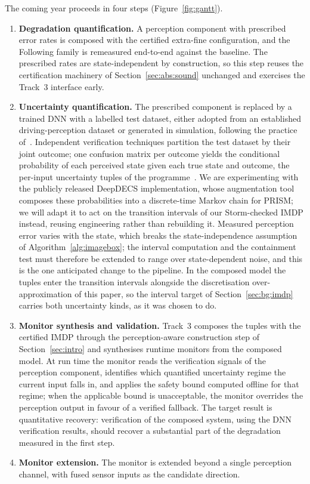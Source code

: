 \documentclass[11pt,a4paper]{article}
\theoremstyle{plain}
\theoremstyle{remark}
\begin{document}
	The coming year proceeds in four steps (Figure~\ref{fig:gantt}).
	\begin{enumerate}
		\item \textbf{Degradation quantification.} A perception component with prescribed error rates is composed with the certified extra-fine configuration, and the Following family is remeasured end-to-end against the baseline. The prescribed rates are state-independent by construction, so this step reuses the certification machinery of Section~\ref{sec:abs:sound} unchanged and exercises the Track~3 interface early.
		\item \textbf{Uncertainty quantification.} The prescribed component is replaced by a trained DNN with a labelled test dataset, either adopted from an established driving-perception dataset or generated in simulation, following the practice of~\cite{DeepDECS24}. Independent verification techniques partition the test dataset by their joint outcome; one confusion matrix per outcome yields the conditional probability of each perceived state given each true state and outcome, the per-input uncertainty tuples of the programme~\cite{DeepDECS24}. We are experimenting with the publicly released DeepDECS implementation, whose augmentation tool composes these probabilities into a discrete-time Markov chain for PRISM; we will adapt it to act on the transition intervals of our Storm-checked IMDP instead, reusing engineering rather than rebuilding it. Measured perception error varies with the state, which breaks the state-independence assumption of Algorithm~\ref{alg:imagebox}; the interval computation and the containment test must therefore be extended to range over state-dependent noise, and this is the one anticipated change to the pipeline. In the composed model the tuples enter the transition intervals alongside the discretisation over-approximation of this paper, so the interval target of Section~\ref{sec:bg:imdp} carries both uncertainty kinds, as it was chosen to do.
		\item \textbf{Monitor synthesis and validation.} Track~3 composes the tuples with the certified IMDP through the perception-aware construction step of Section~\ref{sec:intro} and synthesises runtime monitors from the composed model. At run time the monitor reads the verification signals of the perception component, identifies which quantified uncertainty regime the current input falls in, and applies the safety bound computed offline for that regime; when the applicable bound is unacceptable, the monitor overrides the perception output in favour of a verified fallback. The target result is quantitative recovery: verification of the composed system, using the DNN verification results, should recover a substantial part of the degradation measured in the first step.
		\item \textbf{Monitor extension.} The monitor is extended beyond a single perception channel, with fused sensor inputs as the candidate direction.
	\end{enumerate}
	
\end{document}
